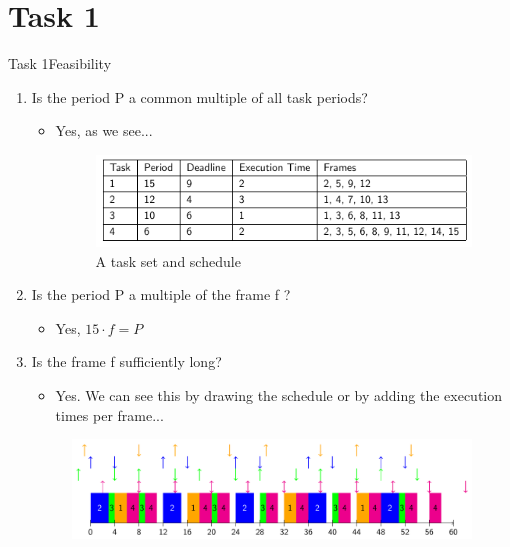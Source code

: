 
\section{Task 1}

\setcounter{task}{1}

\begin{frame}[allowframebreaks]{Task 1}{Feasibility\vspace{0.5cm}}
  \begin{enumerate}
    \item Is the period P a common multiple of all task periods?
      \begin{itemize}
        \item Yes, as we see...
        \begin{figure}
          \centering
          \includegraphics[width=0.7\paperwidth]{./figures/task1_table1.png}
          \caption{A task set and schedule}
        \end{figure}
      \end{itemize}
    \item Is the period P a multiple of the frame f ?
      \begin{itemize}
        \item Yes, $15 \cdot f = P$
      \end{itemize}
    \item Is the frame f sufficiently long?
      \begin{itemize}
        \item Yes. We can see this by drawing the schedule or by adding the execution times per frame...
      \end{itemize}
      \begin{figure}
        \centering
        \includegraphics[width=0.7\paperwidth]{./figures/task1_schedule.png}

\end{figure}
\end{enumerate}
\end{frame}
